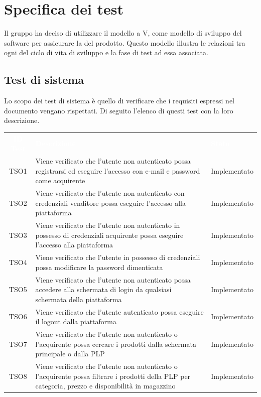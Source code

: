 \section{Specifica dei test}
\label{specificatest}
Il gruppo ha deciso di utilizzare il modello a V, come modello di sviluppo del software per assicurare la  del prodotto. Questo modello illustra le relazioni tra ogni  del ciclo di vita di sviluppo e la fase di test ad essa associata.
\subsection{Test di sistema}
Lo scopo dei test di sistema è quello di verificare che i requisiti espressi nel documento  vengano rispettati. Di seguito l'elenco di questi test con la loro descrizione.
\begin{longtable}{|c| C{10cm} |C{3cm}|}
	\textcolor{white}{\textbf{ID Test}}&
	\textcolor{white}{\textbf{Descrizione}}&
	\textcolor{white}{\textbf{Stato}}\label{tab:TestSistema1}\\
	TSO1 & Viene verificato che l'utente non autenticato possa registrarsi ed eseguire l'accesso  con e-mail e password come acquirente & Implementato\\ \hline
	TSO2 & Viene verificato che l'utente non autenticato con credenziali venditore possa eseguire l'accesso alla piattaforma & Implementato\\ \hline
	TSO3 & Viene verificato che l'utente non autenticato in possesso di credenziali acquirente possa eseguire l'accesso alla piattaforma & Implementato \\ \hline
	TSO4 & Viene verificato che l'utente in possesso di credenziali possa modificare la password dimenticata & Implementato\\ \hline
	TSO5 & Viene verificato che l'utente non autenticato possa accedere alla schermata di login da qualsiasi schermata della piattaforma & Implementato\\ \hline
	TSO6 & Viene verificato che l'utente autenticato possa eseguire il logout dalla piattaforma & Implementato\\ \hline
	TSO7 & Viene verificato che l'utente non autenticato o l'acquirente possa cercare i prodotti dalla schermata principale o dalla PLP & Implementato\\ \hline
	TSO8 & Viene verificato che l'utente non autenticato o l'acquirente possa filtrare i prodotti della PLP per categoria, prezzo e disponibilità in magazzino & Implementato\\ \hline

\end{longtable}
